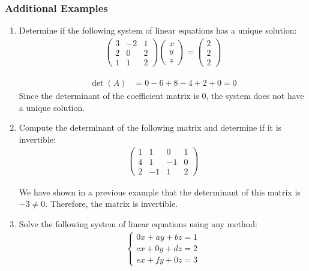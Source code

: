 \documentclass{article}
\begin{document}
\subsubsection*{Additional Examples}
\begin{enumerate}
    \item Determine if the following system of linear equations has a unique solution:
          \begin{align*}
              \begin{pmatrix}
                  3 & -2 & 1 \\
                  2 & 0  & 2 \\
                  1 & 1  & 2
              \end{pmatrix}
              \begin{pmatrix}
                  x \\
                  y \\
                  z
              \end{pmatrix}
              =
              \begin{pmatrix}
                  2 \\
                  2 \\
                  2
              \end{pmatrix}
          \end{align*}

          \begin{align*}
              \det(A) & = 0 - 6 + 8 - 4 + 2 + 0 = 0
          \end{align*}
          Since the determinant of the coefficient matrix is 0, the system does not have a unique solution.

    \item Compute the determinant of the following matrix and determine if it is invertible:
          \begin{align*}
              \begin{pmatrix}
                  1 & 1  & 0  & 1 \\
                  4 & 1  & -1 & 0 \\
                  2 & -1 & 1  & 2
              \end{pmatrix}
          \end{align*}

          We have shown in a previous example that the determinant of this matrix is $-3 \neq 0$. Therefore, the matrix is invertible.

    \item Solve the following system of linear equations using any method:
          \begin{align*}
              \begin{cases}
                  0x + ay + bz = 1 \\
                  cx + 0y + dz = 2 \\
                  ex + fy + 0z = 3
              \end{cases}
          \end{align*}


\end{enumerate}
\end{document}
